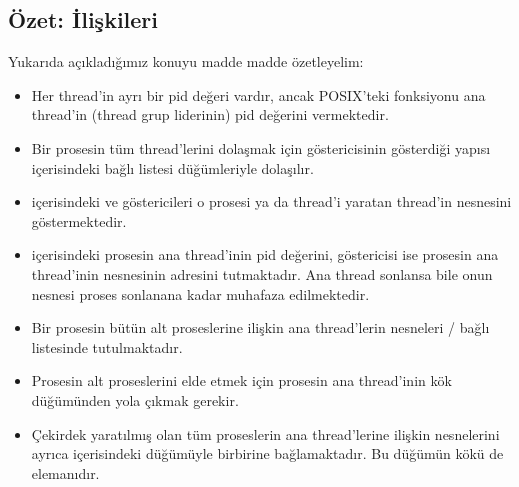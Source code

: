 \documentclass[a4paper,10pt,turkish]{sphinxmanual}
\begin{document}
\subsection{Özet:  İlişkileri}
\label{\detokenize{processcontrolblock:ozet-task-struct-iliskileri}}
\sphinxAtStartPar
Yukarıda açıkladığımız konuyu madde madde özetleyelim:
\begin{itemize}
\item {} 
\sphinxAtStartPar
Her thread’in ayrı bir pid değeri vardır, ancak POSIX’teki  fonksiyonu ana thread’in (thread
grup liderinin) pid değerini vermektedir.

\item {} 
\sphinxAtStartPar
Bir prosesin tüm thread’lerini dolaşmak için  göstericisinin gösterdiği 
yapısı içerisindeki  bağlı listesi  düğümleriyle dolaşılır.

\item {} 
\sphinxAtStartPar
{} içerisindeki  ve  göstericileri o prosesi ya da thread’i
yaratan thread’in  nesnesini göstermektedir.

\item {} 
\sphinxAtStartPar
{} içerisindeki  prosesin ana thread’inin pid değerini, 
göstericisi ise prosesin ana thread’inin  nesnesinin adresini tutmaktadır. Ana thread
sonlansa bile onun  nesnesi proses sonlanana kadar muhafaza edilmektedir.

\item {} 
\sphinxAtStartPar
Bir prosesin bütün alt proseslerine ilişkin ana thread’lerin  nesneleri
/ bağlı listesinde tutulmaktadır.

\item {} 
\sphinxAtStartPar
Prosesin alt proseslerini elde etmek için prosesin ana thread’inin  kök düğümünden yola
çıkmak gerekir.

\item {} 
\sphinxAtStartPar
Çekirdek yaratılmış olan tüm proseslerin ana thread’lerine ilişkin  nesnelerini ayrıca
 içerisindeki  düğümüyle birbirine bağlamaktadır. Bu düğümün kökü de
 elemanıdır.

\end{itemize}
\end{document}
